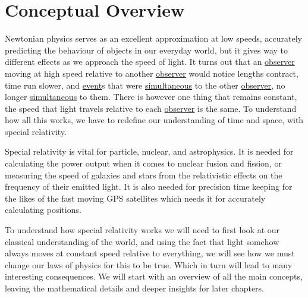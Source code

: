 \mainmatter
\chapter{Conceptual Overview}


Newtonian physics serves as an excellent approximation at low speeds, accurately predicting the behaviour of objects in our everyday world, but it gives way to different effects as we approach the speed of light. It turns out that an \hyperlink{def-observer}{observer} moving at high speed relative to another \hyperlink{def-observer}{observer} would notice lengths contract, time run slower, and \hyperlink{def-event}{event}s that were \hyperlink{def-simultaneity}{simultaneous} to the other \hyperlink{def-observer}{observer}, no longer \hyperlink{def-simultaneity}{simultaneous} to them. There is however one thing that remains constant, the speed that light travels relative to each \hyperlink{def-observer}{observer} is the same. To understand how all this works, we have to redefine our understanding of time and space, with special relativity.

Special relativity is vital for particle, nuclear, and astrophysics. It is needed for calculating the power output when it comes to nuclear fusion and fission, or measuring the speed of galaxies and stars from the relativistic effects on the frequency of their emitted light. It is also needed for precision time keeping for the likes of the fast moving GPS satellites which needs it for accurately calculating positions.

To understand how special relativity works we will need to first look at our classical understanding of the world, and using the fact that light somehow always moves at constant speed relative to everything, we will see how we must change our laws of physics for this to be true. Which in turn will lead to many interesting consequences. We will start with an overview of all the main concepts, leaving the mathematical details and deeper insights for later chapters.



